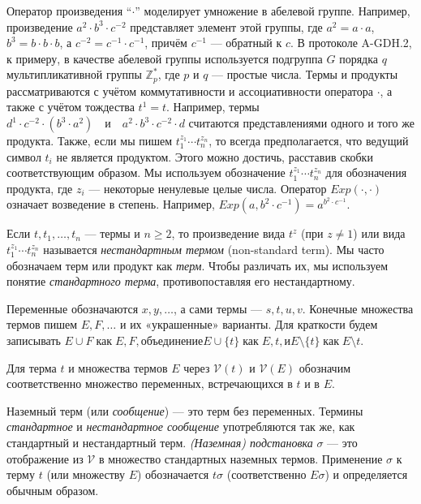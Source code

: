 Оператор произведения ``$\cdot$'' моделирует умножение в абелевой группе. Например, произведение $a^2 \cdot b^3 \cdot c^{-2}$ представляет элемент
этой группы, где $a^2 = a \cdot a$, $b^3 = b \cdot b \cdot b$, а $c^{-2} = c^{-1} \cdot c^{-1}$, причём $c^{-1}$ — обратный к $c$. В протоколе
A-GDH.2, к примеру, в качестве абелевой группы используется подгруппа $G$ порядка $q$ мультипликативной группы $\mathbb{Z}_p^*$, где $p$ и $q$
— простые числа. Термы и продукты рассматриваются с учётом коммутативности и ассоциативности оператора $\cdot$, а также с учётом тождества $t^1
= t$. Например, термы $d^1 \cdot c^{-2} \cdot (b^3 \cdot a^2) \quad \text{и} \quad a^2 \cdot b^3 \cdot c^{-2} \cdot d$ считаются представлениями
одного и того же продукта. Также, если мы пишем $t_1^{z_1} \cdots t_n^{z_n}$, то всегда предполагается, что ведущий символ $t_i$ не является
продуктом. Этого можно достичь, расставив скобки соответствующим образом. Мы используем обозначение $t_1^{z_1} \cdots t_n^{z_n}$ для обозначения
продукта, где $z_i$ — некоторые ненулевые целые числа. Оператор $\mathit{Exp}(\cdot,\cdot)$ означает возведение в степень. Например,
$\mathit{Exp}(a, b^2 \cdot c^{-1}) = a^{b^2 \cdot c^{-1}}$.

Если $t, t_1, \dots, t_n$ — термы и $n \geq 2$, то произведение вида $t^z$ (при $z \ne 1$) или вида $t_1^{z_1} \cdots t_n^{z_n}$ называется
\textit{нестандартным термом} (non-standard term). Мы часто обозначаем терм или продукт как \textit{терм}. Чтобы различать их, мы используем
понятие \textit{стандартного терма}, противопоставляя его нестандартному.

Переменные обозначаются $x,y,\dots$, а сами термы — $s,t,u,v$. 
Конечные множества термов пишем $E,F,\dots$ и их «украшенные» варианты.  
Для краткости будем записывать $E\cup F \;\text{как}\; E,F, \text{объединение} E\cup\{t\} \;\text{как}\; E,t, \text{и} E\setminus\{t\} \;\text{как}\; E\setminus t$.

Для терма $t$ и множества термов $E$ через $\mathcal{V}(t)$ и $\mathcal{V}(E)$ обозначим
соответственно множество переменных, встречающихся в $t$ и в $E$.

Наземный терм (или \emph{сообщение}) — это терм без переменных.
Термины \emph{стандартное} и \emph{нестандартное сообщение} употребляются
так же, как стандартный и нестандартный терм.  
\emph{(Наземная) подстановка} $\sigma$ — это отображение из $\mathcal V$ в множество
стандартных наземных термов.  Применение $\sigma$ к терму $t$ (или множеству $E$)
обозначается $t\sigma$ (соответственно $E\sigma$) и определяется обычным образом.

